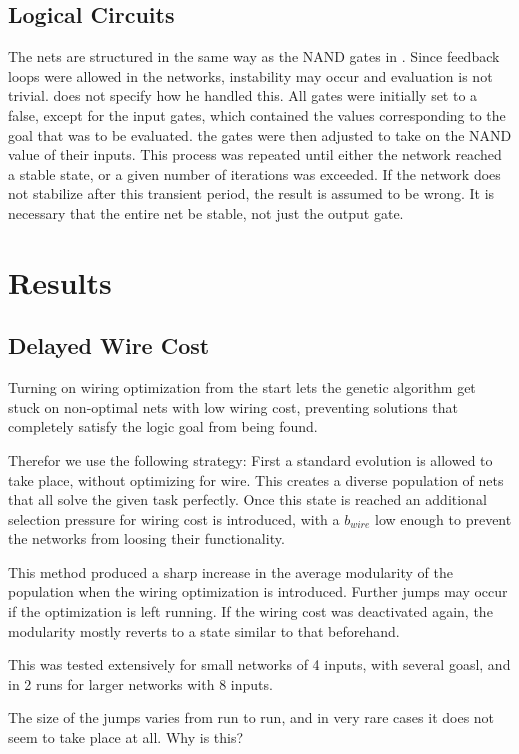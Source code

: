 \documentclass[12pt,a4paper]{article}
\begin{document}
\subsection{Logical Circuits}
The nets are structured in the same way as the NAND gates in  \cite{alon}. Since feedback loops were allowed in the networks, instability may occur and evaluation is not trivial.  \cite{alon} does not specify how he handled this. All gates were initially set to a false, except for the input gates, which contained the values corresponding to the goal that was to be evaluated. the gates were then adjusted to take on the NAND value of their inputs. This process was repeated until either the network reached a stable state, or a given number of iterations was exceeded. If the network does not stabilize after this transient period, the result is assumed to be wrong. It is necessary that the entire net be stable, not just the output gate.

\section{Results}
\subsection{Delayed Wire Cost}
Turning on wiring optimization from the start lets the genetic algorithm get stuck on non-optimal nets with low wiring cost, preventing solutions that completely satisfy the logic goal from being found.

Therefor we use the following strategy: First a standard evolution is allowed to take place, without optimizing for wire. This creates a diverse population of nets that all solve the given task perfectly. Once this state is reached an additional selection pressure for wiring cost is introduced, with a $b_{wire}$ low enough to prevent the networks from loosing their functionality.

This method produced a sharp increase in the average modularity of the population when the wiring optimization is introduced. Further jumps may occur if the optimization is left running. If the wiring cost was deactivated again, the modularity mostly reverts to a state similar to that beforehand.

This was tested extensively for small networks of 4 inputs, with several goasl, and in 2 runs for larger networks with 8 inputs.

The size of the jumps varies from run to run, and in very rare cases it does not seem to take place at all. Why is this?
\end{document}
